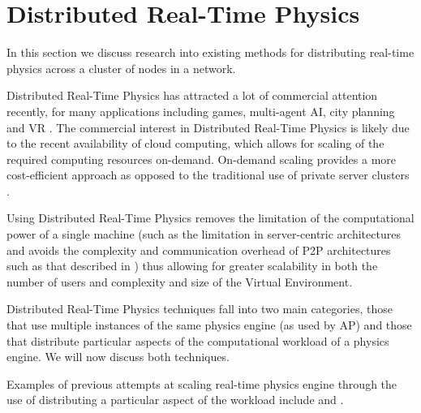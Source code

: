 \section{Distributed Real-Time Physics}

In this section we discuss research into existing methods for distributing real-time physics across a cluster of nodes in a network.

Distributed Real-Time Physics has attracted a lot of commercial attention recently, for many applications including games, multi-agent AI, city planning and VR \cite{SpatialOS}. The commercial interest in Distributed Real-Time Physics is likely due to the recent availability of cloud computing, which allows for scaling of the required computing resources on-demand. On-demand scaling provides a more cost-efficient approach as opposed to the traditional use of private server clusters \cite{On-DemandResourceMMOGs}.

Using Distributed Real-Time Physics removes the limitation of the computational power of a single machine (such as the limitation in server-centric architectures \cite{ScalabilityforVirtualWorlds} and avoids the complexity and communication overhead of P2P architectures such as that described in \cite{VON}) thus allowing for greater scalability in both the number of users \cite{ScalabilityIssues} and complexity and size of the Virtual Environment. 

Distributed Real-Time Physics techniques fall into two main categories, those that use multiple instances of the same physics engine (as used by AP) and those that distribute particular aspects of the computational workload of a physics engine. We will now discuss both techniques.

Examples of previous attempts at scaling real-time physics engine through the use of distributing a particular aspect of the workload include \cite{Morgan2005} and \cite{allard2006distributed}.

